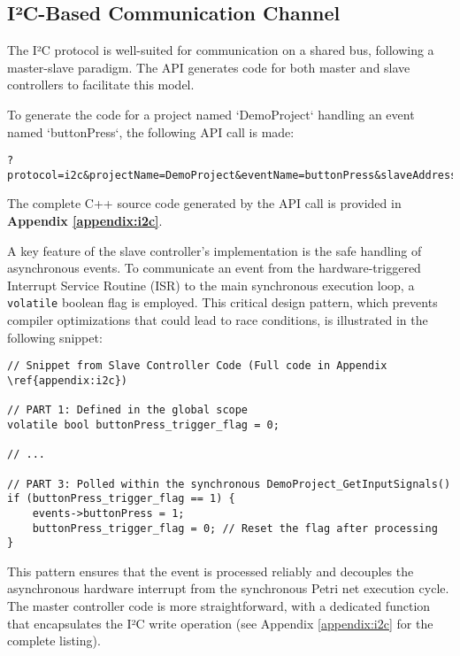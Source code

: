 \subsection{I²C-Based Communication Channel}
\label{subsec:i2c_analysis}

The I²C protocol is well-suited for communication on a shared bus, following a master-slave paradigm. The API generates code for both master and slave controllers to facilitate this model.

To generate the code for a project named `DemoProject` handling an event named `buttonPress`, the following API call is made:
\begin{verbatim}
?protocol=i2c&projectName=DemoProject&eventName=buttonPress&slaveAddress=9&slaveMessage=P
\end{verbatim}

The complete C++ source code generated by the API call is provided in \textbf{Appendix \ref{appendix:i2c}}.

A key feature of the slave controller's implementation is the safe handling of asynchronous events. To communicate an event from the hardware-triggered Interrupt Service Routine (ISR) to the main synchronous execution loop, a \texttt{volatile} boolean flag is employed. This critical design pattern, which prevents compiler optimizations that could lead to race conditions, is illustrated in the following snippet:

\begin{verbatim}
// Snippet from Slave Controller Code (Full code in Appendix \ref{appendix:i2c})

// PART 1: Defined in the global scope
volatile bool buttonPress_trigger_flag = 0;

// ...

// PART 3: Polled within the synchronous DemoProject_GetInputSignals()
if (buttonPress_trigger_flag == 1) {
    events->buttonPress = 1;
    buttonPress_trigger_flag = 0; // Reset the flag after processing
}
\end{verbatim}
This pattern ensures that the event is processed reliably and decouples the asynchronous hardware interrupt from the synchronous Petri net execution cycle. The master controller code is more straightforward, with a dedicated function that encapsulates the I²C write operation (see Appendix \ref{appendix:i2c} for the complete listing).

